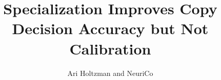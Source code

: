 \documentclass{article}
\title{Specialization Improves Copy Decision Accuracy but Not Calibration}
\author{Ari Holtzman and NeuriCo}
\begin{document}
\maketitle

\begin{abstract}

\end{abstract}










\end{document}
